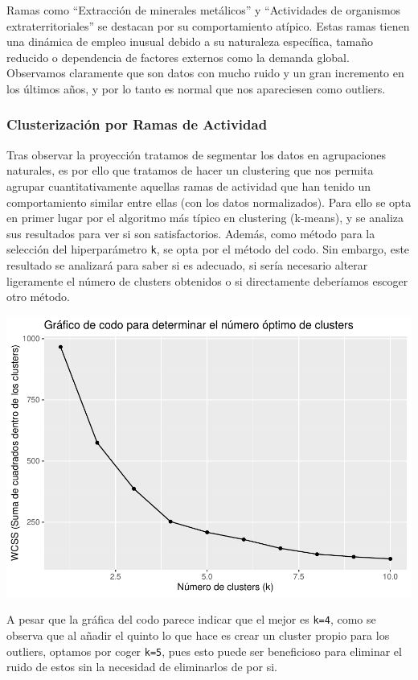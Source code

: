 \documentclass[notspecified,article,submit,moreauthors,pdftex]{Definitions/mdpi}
\begin{document}
Ramas como ``Extracción de minerales metálicos'' y ``Actividades de
organismos extraterritoriales'' se destacan por su comportamiento
atípico. Estas ramas tienen una dinámica de empleo inusual debido a su
naturaleza específica, tamaño reducido o dependencia de factores
externos como la demanda global. Observamos claramente que son datos con
mucho ruido y un gran incremento en los últimos años, y por lo tanto es
normal que nos apareciesen como outliers.

\subsubsection{Clusterización por Ramas de
Actividad}\label{clusterizaciuxf3n-por-ramas-de-actividad}

Tras observar la proyección tratamos de segmentar los datos en
agrupaciones naturales, es por ello que tratamos de hacer un clustering
que nos permita agrupar cuantitativamente aquellas ramas de actividad
que han tenido un comportamiento similar entre ellas (con los datos
normalizados). Para ello se opta en primer lugar por el algoritmo más
típico en clustering (k-means), y se analiza sus resultados para ver si
son satisfactorios. Además, como método para la selección del
hiperparámetro \texttt{k}, se opta por el método del codo. Sin embargo,
este resultado se analizará para saber si es adecuado, si sería
necesario alterar ligeramente el número de clusters obtenidos o si
directamente deberíamos escoger otro método.

\includegraphics{ProyectoAED2024_files/figure-latex/unnamed-chunk-45-1.pdf}

A pesar que la gráfica del codo parece indicar que el mejor es
\texttt{k=4}, como se observa que al añadir el quinto lo que hace es
crear un cluster propio para los outliers, optamos por coger
\texttt{k=5}, pues esto puede ser beneficioso para eliminar el ruido de
estos sin la necesidad de eliminarlos de por si.
\end{document}
